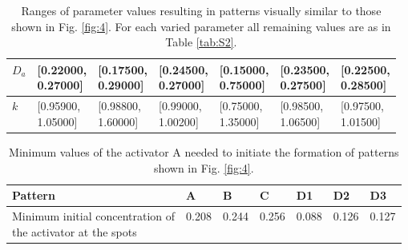 \begin{table}[!htb]
\begin{tabular}{|l|l|l|l|l|l|l|}
$D_{a}$				& \thead{{[}0.22000, \\ 0.27000{]}} & \thead{{[}0.17500, \\ 0.29000{]}} & \thead{{[}0.24500, \\ 0.27000{]}} & \thead{{[}0.15000, \\ 0.75000{]}} & \thead{{[}0.23500, \\ 0.27500{]}} & \thead{{[}0.22500, \\ 0.28500{]}} \\ \hline
$k$					& \thead{{[}0.95900, \\ 1.05000{]}} & \thead{{[}0.98800, \\ 1.60000{]}} & \thead{{[}0.99000, \\ 1.00200{]}} & \thead{{[}0.75000, \\ 1.35000{]}} & \thead{{[}0.98500, \\ 1.06500{]}} & \thead{{[}0.97500, \\ 1.01500{]}} \\ \hline
\end{tabular}
\caption{Ranges of parameter values resulting in patterns visually similar to those shown in Fig. \ref{fig:4}. For each varied parameter all remaining values are as in Table \ref{tab:S2}.}
\label{tab:S3}
\end{table}

\begin{table}[!htb]
\centering
\begin{tabular}{|l|l|l|l|l|l|l|}
\hline
\textbf{Pattern}                                            & \textbf{A} & \textbf{B} & \textbf{C} & \textbf{D1} & \textbf{D2} & \textbf{D3} \\ \hline
\thead{Minimum initial concentration of \\ the activator at the spots} & 0.208      & 0.244      & 0.256      & 0.088       & 0.126       & 0.127       \\ \hline
\end{tabular}
\caption{Minimum values of the activator A needed to initiate the formation of patterns shown in Fig. \ref{fig:4}.}
\label{tab:S4}
\end{table}

